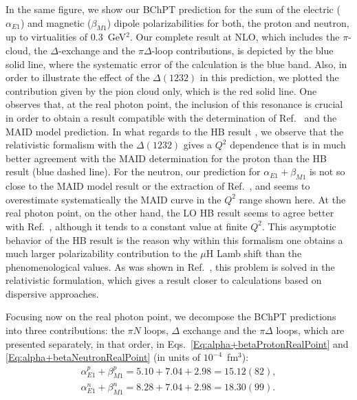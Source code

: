 \documentclass[twocolumn,prc,showpacs,nofootinbib,preprintnumbers,amsmath,amssymb,superscriptaddress]{revtex4-1}
\begin{document}
In the same figure, we show our BChPT prediction for the sum of the electric ($\alpha_{E1}$) and magnetic ($\beta_{M1}$) dipole polarizabilities for both, the proton and neutron, up to virtualities of $0.3$~GeV$^2$.
Our complete result at NLO, which includes the $\pi$-cloud, the $\Delta$-exchange and the $\pi \Delta$-loop contributions, is depicted by the blue solid line, where the systematic error of the calculation is the blue band.
Also, in order to illustrate the effect of the $\Delta(1232)$ in this prediction, we plotted the contribution given by the pion cloud only, which is the red solid line. 
One observes that, at the real photon point, the inclusion of this resonance is crucial in order to obtain a result compatible with the determination of Ref.~\cite{Babusci:1997ij} and the MAID model prediction.
In what regards to the HB result \cite{Nevado:2007dd}, we observe that the relativistic formalism with the $\Delta(1232)$ gives a $Q^2$ dependence that is in much better agreement with the MAID determination for the proton than the HB result (blue dashed line).
For the neutron, our prediction for $\alpha_{E1} + \beta_{M1}$ is not so close to the MAID model result or the extraction of Ref.~\cite{Babusci:1997ij}, and seems to overestimate systematically the MAID curve in the $Q^2$ range shown here.
At the real photon point, on the other hand, the LO HB result seems to agree better with Ref.~\cite{Babusci:1997ij}, although it tends to a constant value at finite $Q^2$. 
This asymptotic behavior of the HB result is the reason why within this formalism one obtains a much larger polarizability contribution to the $\mu$H Lamb shift than the phenomenological values.
As was shown in Ref.~\cite{Alarcon:2013cba}, this problem is solved in the relativistic formulation, which gives a result closer to calculations based on dispersive approaches.
 
Focusing now on the real photon point, we decompose the BChPT predictions into three contributions:  the $\pi N$ loops, $\Delta$ exchange and the $\pi \Delta$ loops, which are presented separately, in that order, in Eqs.~\eqref{Eq:alpha+betaProtonRealPoint} and \eqref{Eq:alpha+betaNeutronRealPoint} (in units of $10^{-4}$~fm$^3$):
\begin{align}
\alpha_{E1}^p+\beta_{M1}^p = 5.10+7.04+2.98=15.12(82), \label{Eq:alpha+betaProtonRealPoint}\\
\alpha_{E1}^n+\beta_{M1}^n = 8.28+7.04+2.98=18.30(99). \label{Eq:alpha+betaNeutronRealPoint}
\end{align}
\end{document}
